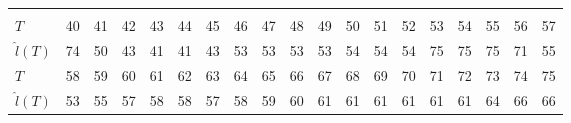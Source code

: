 \documentclass[12pt,a4paper]{article}
\begin{document}
\begin{landscape}
\begin{table}[htbp]
\begin{tabular*}{\linewidth}{@{\extracolsep{\fill}}lrrrrrrrrrrrrrrrrrr}
			\midrule\addlinespace[2.5pt]
			\multicolumn{19}{c}{\textbf{$\tau=0.95,\ T_{\mathrm{stab}}=57,\ \varepsilon=15$}} \\
			\addlinespace[2.5pt]
			\midrule
			$T$ & 40 & 41 & 42 & 43 & 44 & 45 & 46 & 47 & 48 & 49 & 50 & 51 & 52 & 53 & 54 & 55 & 56 & 57 \\
			$\hat{l}(T)$ & 74 & 50 & 43 & 41 & 41 & 43 & 53 & 53 & 53 & 53 & 54 & 54 & 54 & 75 & 75 & 75 & 71 & 55 \\
			$T$ & 58 & 59 & 60 & 61 & 62 & 63 & 64 & 65 & 66 & 67 & 68 & 69 & 70 & 71 & 72 & 73 & 74 & 75 \\
			$\hat{l}(T)$ & 53 & 55 & 57 & 58 & 58 & 57 & 58 & 59 & 60 & 61 & 61 & 61 & 61 & 61 & 61 & 64 & 66 & 66 \\
			\bottomrule
		\end{tabular*}
	\end{table}
\end{landscape}
\end{document}
